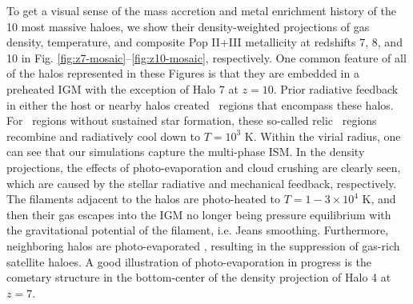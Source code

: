 \documentclass[useAMS,usenatbib]{mn2e}
\begin{document}
\begin{figure*}
  \caption{\label{fig:z7-mosaic} Density-weighted projections of
    density (left), temperature (center), and metallicity (right) of
    the 10 most massive haloes at $z=7$.  The field of view is 5 proper
    kpc, and the circles have a radius of $r_{200}$.  The composite
    metallicity images are constructed in the same fashion as
    Fig. \ref{fig:evo-mosaic}.}
\end{figure*}

\begin{figure*}
  \caption{\label{fig:z8-mosaic} Same as Fig. \ref{fig:z7-mosaic} but
    at $z=8$, showing the progenitors of the 10 most massive haloes at
    $z=7$.}
\end{figure*}

\begin{figure*}
  \caption{\label{fig:z10-mosaic} Same as Fig. \ref{fig:z8-mosaic} at
    $z=10$.}
\end{figure*}

To get a visual sense of the mass accretion and metal enrichment
history of the 10 most massive haloes, we show their density-weighted
projections of gas density, temperature, and composite Pop II+III
metallicity at redshifts 7, 8, and 10 in
Fig. \ref{fig:z7-mosaic}--\ref{fig:z10-mosaic}, respectively.  One
common feature of all of the halos represented in these Figures is
that they are embedded in a preheated IGM with the exception of Halo 7
at $z=10$.  Prior radiative feedback in either the host or nearby
halos created \hii~regions that encompass these halos.  For
\hii~regions without sustained star formation, these so-called relic
\hii~regions recombine and radiatively cool down to $T = 10^3$ K.
Within the virial radius, one can see that our simulations capture the
multi-phase ISM.  In the density projections, the effects of
photo-evaporation and cloud crushing are clearly seen, which are
caused by the stellar radiative and mechanical feedback, respectively.
The filaments adjacent to the halos are photo-heated to $T = 1-3
\times 10^4$ K, and then their gas escapes into the IGM no longer
being pressure equilibrium with the gravitational potential of the
filament, i.e. Jeans smoothing.  Furthermore, neighboring halos are
photo-evaporated \citep[see][for the level of halo
  photo-evaporation]{Wise08_Reion}, resulting in the suppression of
gas-rich satellite haloes.  A good illustration of photo-evaporation
in progress is the cometary structure in the bottom-center of the
density projection of Halo 4 at $z=7$.
\end{document}
